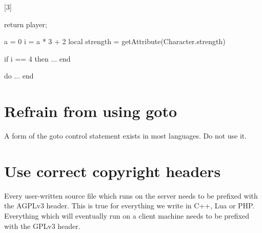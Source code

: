 \documentclass[a4paper,11pt]{scrreprt}
\newcommand{\marginMarker}[1]{%
\marginnote{%
    \hfill%
		\Huge{#1}%
}[3\baselineskip]%
}
\newcommand{\conforming}{%
\marginMarker{\textcolor{green}{\ding{51}}}%
}
\begin{document}
\conforming{}
\begin{cppBox}
return player;
\end{cppBox}
\begin{luaBox}[mathescape]
a = 0
i = a * 3 + 2
local strength = getAttribute(Character.strength)

if i == 4 then
    $\dots$
end

do
    $\dots$
end
\end{luaBox}

\section{Refrain from using goto}
A form of the goto control statement exists in most languages. Do not use it.

\section{Use correct copyright headers}
Every user-written source file which runs on the server needs to be prefixed with the AGPLv3 header. This is true for everything we write in C++, Lua or PHP. Everything which will eventually run on a client machine needs to be prefixed with the GPLv3 header.
\end{document}
